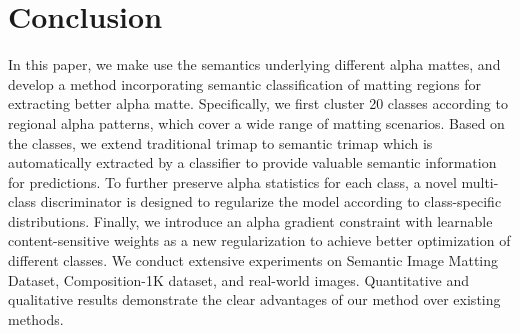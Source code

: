 \documentclass[10pt,twocolumn,letterpaper]{article}
\begin{document}
\section{Conclusion}
\vspace{-8pt}
In this paper, we make use the semantics underlying different alpha mattes, and develop a method incorporating semantic classification of matting regions for extracting better alpha matte. 
Specifically, we first cluster 20 classes according to regional alpha patterns, which cover a wide range of matting scenarios. Based on the classes, we extend traditional trimap to semantic trimap which is automatically extracted by a classifier to provide valuable semantic information for predictions. 
To further preserve alpha statistics for each class, a novel multi-class discriminator is designed to regularize the model according to class-specific distributions. Finally, we introduce an alpha gradient constraint with learnable content-sensitive weights as a new regularization to achieve better optimization of different classes. We conduct extensive experiments on Semantic Image Matting Dataset, Composition-1K dataset, and real-world images. 
Quantitative and qualitative results demonstrate the clear advantages of our method over existing methods.



{\small


}
\end{document}
